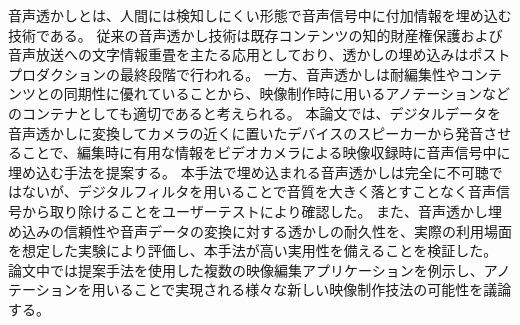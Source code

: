 \begin{jabstract}
音声透かしとは、人間には検知しにくい形態で音声信号中に付加情報を埋め込む技術である。
従来の音声透かし技術は既存コンテンツの知的財産権保護および音声放送への文字情報重畳を主たる応用としており、透かしの埋め込みはポストプロダクションの最終段階で行われる。
一方、音声透かしは耐編集性やコンテンツとの同期性に優れていることから、映像制作時に用いるアノテーションなどのコンテナとしても適切であると考えられる。
本論文では、デジタルデータを音声透かしに変換してカメラの近くに置いたデバイスのスピーカーから発音させることで、編集時に有用な情報をビデオカメラによる映像収録時に音声信号中に埋め込む手法を提案する。
本手法で埋め込まれる音声透かしは完全に不可聴ではないが、デジタルフィルタを用いることで音質を大きく落とすことなく音声信号から取り除けることをユーザーテストにより確認した。
また、音声透かし埋め込みの信頼性や音声データの変換に対する透かしの耐久性を、実際の利用場面を想定した実験により評価し、本手法が高い実用性を備えることを検証した。
論文中では提案手法を使用した複数の映像編集アプリケーションを例示し、アノテーションを用いることで実現される様々な新しい映像制作技法の可能性を議論する。
\end{jabstract}
